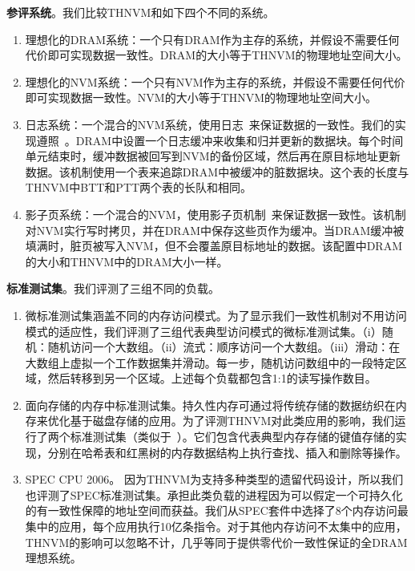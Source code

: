 \textbf{参评系统}。我们比较THNVM和如下四个不同的系统。
\begin{enumerate}
\item 理想化的DRAM系统：一个只有DRAM作为主存的系统，并假设不需要任何代价即可实现数据一致性。DRAM的大小等于THNVM的物理地址空间大小。 
\item 理想化的NVM系统：一个只有NVM作为主存的系统，并假设不需要任何代价即可实现数据一致性。NVM的大小等于THNVM的物理地址空间大小。 
\item 日志系统：一个混合的NVM系统，使用日志~\cite{DeWitt:1984:ITM:602259.602261, Hagmann:1987:RCF:41457.37518,
ext4}来保证数据的一致性。我们的实现遵照~\cite{Remzi:Journaling}。DRAM中设置一个日志缓冲来收集和归并更新的数据块。每个时间单元结束时，缓冲数据被回写到NVM的备份区域，然后再在原目标地址更新数据。该机制使用一个表来追踪DRAM中被缓冲的脏数据块。这个表的长度与THNVM中BTT和PTT两个表的长队和相同。 
\item 影子页系统：一个混合的NVM，使用影子页机制~\cite{bernstein2009principles}来保证数据一致性。该机制对NVM实行写时拷贝，并在DRAM中保存这些页作为缓冲。当DRAM缓冲被填满时，脏页被写入NVM，但不会覆盖原目标地址的数据。该配置中DRAM的大小和THNVM中的DRAM大小一样。
\end{enumerate}
 
\textbf{标准测试集}。我们评测了三组不同的负载。

\begin{enumerate}
\item 微标准测试集涵盖不同的内存访问模式。为了显示我们一致性机制对不用访问模式的适应性，我们评测了三组代表典型访问模式的微标准测试集。（i）随机：随机访问一个大数组。（ii）流式：顺序访问一个大数组。（iii）滑动：在大数组上虚拟一个工作数据集并滑动。每一步，随机访问数组中的一段特定区域，然后转移到另一个区域。上述每个负载都包含1:1的读写操作数目。
\item 面向存储的内存中标准测试集。持久性内存可通过将传统存储的数据纺织在内存来优化基于磁盘存储的应用。为了评测THNVM对此类应用的影响，我们运行了两个标准测试集（类似于~\cite{Coburn:2011:NMP:1950365.1950380, Zhao:2013:KCP:2540708.2540744}）。它们包含代表典型内存存储的键值存储的实现，分别在哈希表和红黑树的内存数据结构上执行查找、插入和删除等操作。 
\item SPEC CPU 2006。 因为THNVM为支持多种类型的遗留代码设计，所以我们也评测了SPEC标准测试集。承担此类负载的进程因为可以假定一个可持久化的有一致性保障的地址空间而获益。我们从SPEC套件中选择了8个内存访问最集中的应用，每个应用执行10亿条指令。对于其他内存访问不太集中的应用，THNVM的影响可以忽略不计，几乎等同于提供零代价一致性保证的全DRAM理想系统。 
\end{enumerate}

